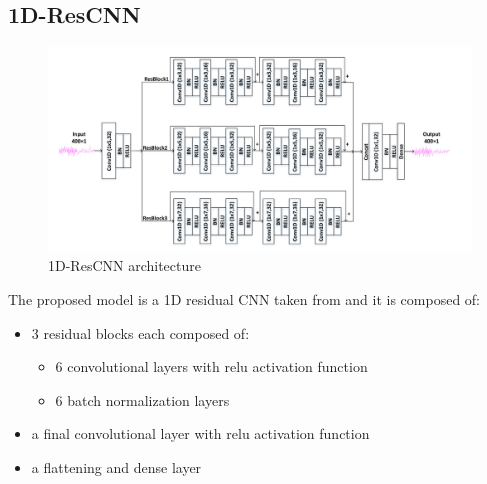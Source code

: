 \documentclass[a4paper, noexaminfo]{sapthesis}
\begin{document}
\subsection{1D-ResCNN}\label{sec:1D-ResCNN}
\begin{figure}[h!]
  \centering
  \includegraphics[width=1\linewidth]{model_architecture_Res_CNN.png}
  \caption{1D-ResCNN architecture}
  \end{figure}
The proposed model is a 1D residual CNN taken from\cite{1DResCNN}
 and it is composed of:
\begin{itemize}
\item 3 residual blocks each composed of:
\begin{itemize}
\item 6 convolutional layers with relu activation function
\item 6 batch normalization layers
\end{itemize}
\item a final convolutional layer with relu activation function
\item a flattening and dense layer 
\end{itemize}
\end{document}
